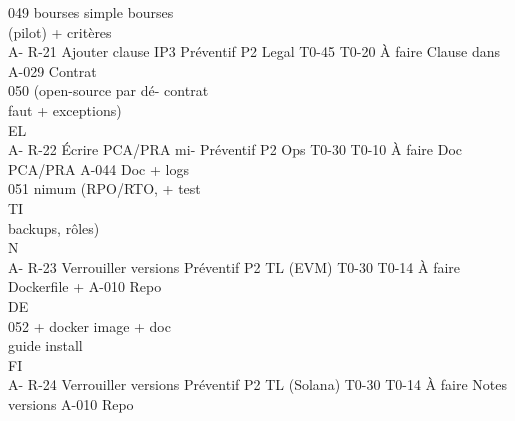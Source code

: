 049         bourses simple                                                          bourses\\
(pilot) + critères\\
A- R-21     Ajouter clause IP3 Préventif P2       Legal       T0-45 T0-20 À faire   Clause dans    A-029    Contrat\\
050         (open-source par dé-                                                    contrat\\
faut + exceptions)\\
\vspace{0.5em}
\vspace{0.5em}
\vspace{0.5em}
\vspace{0.5em}
EL\\
A- R-22     Écrire PCA/PRA mi- Préventif P2       Ops         T0-30 T0-10 À faire   Doc PCA/PRA A-044       Doc + logs\\
051         nimum (RPO/RTO,                                                         + test\\
\vspace{0.5em}
\vspace{0.5em}
\vspace{0.5em}
\vspace{0.5em}
TI\\
backups, rôles)\\
\vspace{0.5em}
\vspace{0.5em}
\vspace{0.5em}
\vspace{0.5em}
N\\
A- R-23     Verrouiller versions Préventif P2     TL (EVM)    T0-30 T0-14 À faire   Dockerfile +   A-010    Repo\\
\vspace{0.5em}
\vspace{0.5em}
\vspace{0.5em}
\vspace{0.5em}
DE\\
052         + docker image +                                                        doc\\
guide install\\
\vspace{0.5em}
\vspace{0.5em}
\vspace{0.5em}
\vspace{0.5em}
FI\\
A- R-24     Verrouiller versions Préventif P2     TL (Solana) T0-30 T0-14 À faire   Notes versions A-010    Repo\\

